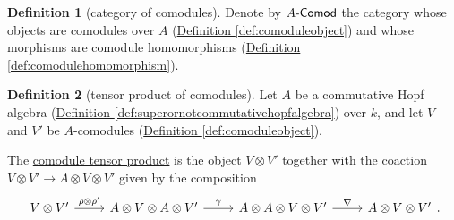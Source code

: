 \documentclass[a4paper,10pt]{scrreprt}
\newcommand{\defn}[1]{\ul{#1}}
\def\mhyp{{\hbox{-}}}
\theoremstyle{definition}
\newtheorem{definition}{Definition}[section]
\theoremstyle{plain}
\theoremstyle{remark}
\begin{document}
\begin{definition}[category of comodules]
  \label{def:categoryofcomodules}
  Denote by $A\mhyp\mathsf{Comod}$ the category whose objects are comodules over $A$ (\hyperref[def:comoduleobject]{Definition \ref*{def:comoduleobject}}) and whose morphisms are comodule homomorphisms (\hyperref[def:comodulehomomorphism]{Definition \ref*{def:comodulehomomorphism}}).
\end{definition}

\begin{definition}[tensor product of comodules]
  \label{def:tensorproductofcomodules}
  Let $A$ be a commutative Hopf algebra (\hyperref[def:superornotcommutativehopfalgebra]{Definition \ref*{def:superornotcommutativehopfalgebra}}) over $k$, and let $V$ and $V'$ be $A$-comodules (\hyperref[def:comoduleobject]{Definition \ref*{def:comoduleobject}}).

  The \defn{comodule tensor product} is the object $V \otimes V'$ together with the coaction $V \otimes V' \to A \otimes V \otimes V'$ given by the composition
  \begin{equation*}
    \begin{tikzcd}
      V \otimes V'
      \arrow[r, "\rho \otimes \rho'"]
      & A \otimes V \otimes A \otimes V'
      \arrow[r, "\gamma"]
      & A \otimes A \otimes V \otimes V'
      \arrow[r, "\nabla"]
      & A \otimes V \otimes V'
    \end{tikzcd}.
  \end{equation*}
\end{definition}
\end{document}
